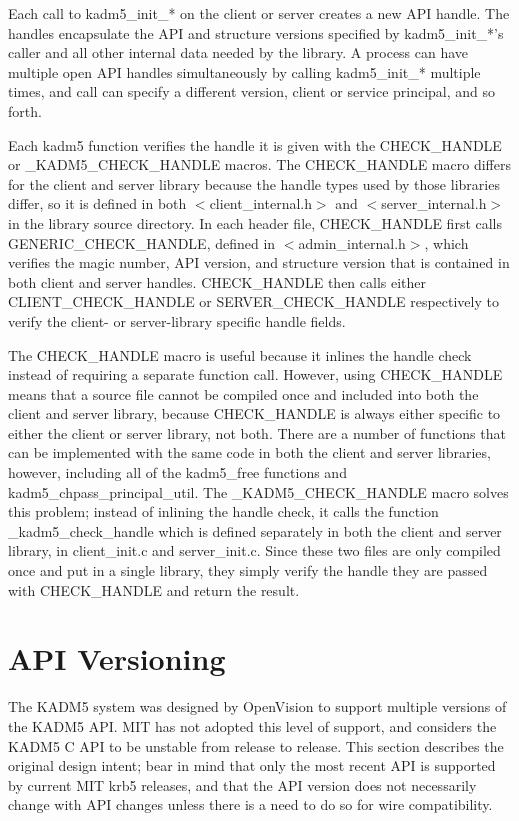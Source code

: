 Each call to kadm5_init_* on the client or server creates a new API
handle.  The handles encapsulate the API and structure versions
specified by kadm5_init_*'s caller and all other internal data needed
by the library.  A process can have multiple open API handles
simultaneously by calling kadm5_init_* multiple times, and call can
specify a different version, client or service principal, and so
forth.

Each kadm5 function verifies the handle it is given with the
CHECK_HANDLE or _KADM5_CHECK_HANDLE macros.  The CHECK_HANDLE macro
differs for the client and server library because the handle types
used by those libraries differ, so it is defined in both
$<$client_internal.h$>$ and $<$server_internal.h$>$ in the library
source directory.  In each header file, CHECK_HANDLE first calls
GENERIC_CHECK_HANDLE, defined in $<$admin_internal.h$>$, which
verifies the magic number, API version, and structure version that is
contained in both client and server handles.  CHECK_HANDLE then calls
either CLIENT_CHECK_HANDLE or SERVER_CHECK_HANDLE respectively to
verify the client- or server-library specific handle fields.

The CHECK_HANDLE macro is useful because it inlines the handle check
instead of requiring a separate function call.  However, using
CHECK_HANDLE means that a source file cannot be compiled once and
included into both the client and server library, because CHECK_HANDLE
is always either specific to either the client or server library, not
both.  There are a number of functions that can be implemented with
the same code in both the client and server libraries, however,
including all of the kadm5_free functions and
kadm5_chpass_principal_util.  The _KADM5_CHECK_HANDLE macro solves
this problem; instead of inlining the handle check, it calls the
function _kadm5_check_handle which is defined separately in both the
client and server library, in client_init.c and server_init.c.
Since these two files are only compiled once and put in a single
library, they simply verify the handle they are passed with
CHECK_HANDLE and return the result.

\section{API Versioning}

The KADM5 system was designed by OpenVision to support multiple
versions of the KADM5 API.  MIT has not adopted this level of support,
and considers the KADM5 C API to be unstable from release to release.
This section describes the original design intent; bear in mind that
only the most recent API is supported by current MIT krb5 releases,
and that the API version does not necessarily change with API changes
unless there is a need to do so for wire compatibility.

